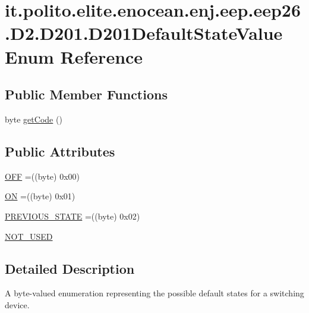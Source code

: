\hypertarget{enumit_1_1polito_1_1elite_1_1enocean_1_1enj_1_1eep_1_1eep26_1_1_d2_1_1_d201_1_1_d201_default_state_value}{}\section{it.\+polito.\+elite.\+enocean.\+enj.\+eep.\+eep26.\+D2.\+D201.\+D201\+Default\+State\+Value Enum Reference}
\label{enumit_1_1polito_1_1elite_1_1enocean_1_1enj_1_1eep_1_1eep26_1_1_d2_1_1_d201_1_1_d201_default_state_value}
\subsection*{Public Member Functions}
\begin{DoxyCompactItemize}
\item 
byte \hyperlink{enumit_1_1polito_1_1elite_1_1enocean_1_1enj_1_1eep_1_1eep26_1_1_d2_1_1_d201_1_1_d201_default_state_value_a1d613560413f82fa06a9a2cb0e287a42}{get\+Code} ()
\end{DoxyCompactItemize}
\subsection*{Public Attributes}
\begin{DoxyCompactItemize}
\item 
\hyperlink{enumit_1_1polito_1_1elite_1_1enocean_1_1enj_1_1eep_1_1eep26_1_1_d2_1_1_d201_1_1_d201_default_state_value_a9cbe26dacb2636da1868687fc4686499}{O\+FF} =((byte) 0x00)
\item 
\hyperlink{enumit_1_1polito_1_1elite_1_1enocean_1_1enj_1_1eep_1_1eep26_1_1_d2_1_1_d201_1_1_d201_default_state_value_a9631f1e7f0fcc191327f63c455482a35}{ON} =((byte) 0x01)
\item 
\hyperlink{enumit_1_1polito_1_1elite_1_1enocean_1_1enj_1_1eep_1_1eep26_1_1_d2_1_1_d201_1_1_d201_default_state_value_abb0674012dd474bca97ab479fa0163b0}{P\+R\+E\+V\+I\+O\+U\+S\+\_\+\+S\+T\+A\+TE} =((byte) 0x02)
\item 
\hyperlink{enumit_1_1polito_1_1elite_1_1enocean_1_1enj_1_1eep_1_1eep26_1_1_d2_1_1_d201_1_1_d201_default_state_value_acba1b20afaa808801ebaf9cba6a335b4}{N\+O\+T\+\_\+\+U\+S\+ED}
\end{DoxyCompactItemize}


\subsection{Detailed Description}
A byte-\/valued enumeration representing the possible default states for a switching device.

